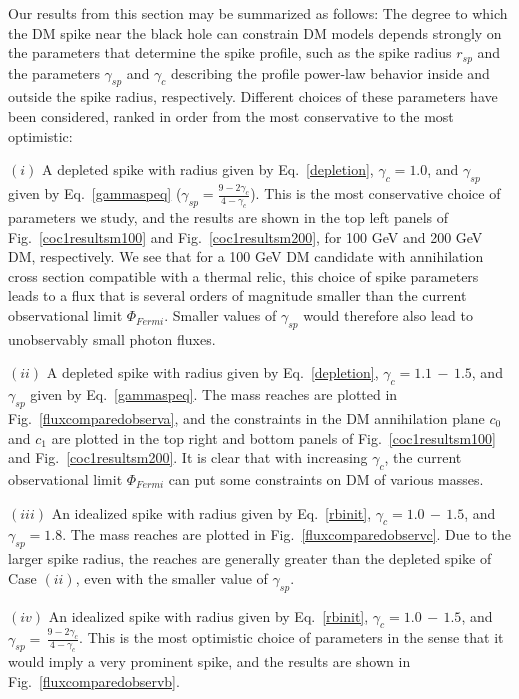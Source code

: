\documentclass[11pt]{article}
\begin{document}
Our results from this section may be summarized as follows: The degree to which the DM spike near the black hole can constrain DM models depends strongly on the parameters that determine the spike profile, such as the spike radius $r_{sp}$ and the parameters $\gamma_{sp}$ and $\gamma_c$ describing the  profile power-law behavior inside and outside the spike radius, respectively. Different choices of these parameters have been considered, ranked in order from the most conservative to the most optimistic:

$(i)$ A depleted spike with radius given by Eq.~\ref{depletion}, $\gamma_{c} = 1.0$, and $\gamma_{sp}$ given by Eq.~\ref{gammaspeq} ($\gamma_{sp}=\frac{9-2\gamma_c}{4-\gamma_c}$).  This is the most conservative choice of parameters we study, and the results are shown in the top left panels of Fig.~\ref{coc1resultsm100} and Fig.~\ref{coc1resultsm200}, for 100 GeV and 200 GeV DM, respectively. We see that for a 100 GeV DM candidate with annihilation cross section compatible with a thermal relic, this choice of spike parameters leads to a flux that is several orders of magnitude smaller than the current observational limit $\Phi_{Fermi}$.  Smaller values of $\gamma_{sp}$ would therefore also lead to unobservably small photon fluxes.

$(ii)$ A depleted spike with radius given by Eq.~\ref{depletion}, $\gamma_{c} = 1.1 \, - \,  1.5$, and $\gamma_{sp}$ given by Eq.~\ref{gammaspeq}. The mass reaches are plotted in Fig.~\ref{fluxcomparedobserva}, and the constraints in the DM annihilation plane $c_0$ and $c_1$ are plotted in the top right and bottom panels of Fig.~\ref{coc1resultsm100} and Fig.~\ref{coc1resultsm200}. It is clear that with increasing $\gamma_c$, the current observational limit $\Phi_{Fermi}$ can put some constraints on DM of various masses.

$(iii)$ An idealized spike with radius given by Eq.~\ref{rbinit}, $\gamma_{c} = 1.0 \, - \, 1.5$, and $\gamma_{sp} = 1.8$. The mass reaches are plotted in Fig.~\ref{fluxcomparedobservc}. Due to the larger spike radius, the reaches are generally greater than the depleted spike of Case $(ii)$, even with the smaller value of $\gamma_{sp}$.

$(iv)$ An idealized spike  with radius given by Eq.~\ref{rbinit}, $\gamma_{c} = 1.0 \, - \, 1.5$, and $\gamma_{sp} =  \, \frac{9-2 \gamma_c}{4 - \gamma_c}$. This is the most optimistic choice of parameters in the sense that it would imply a very prominent spike, and the results are shown in Fig.~\ref{fluxcomparedobservb}. 
\end{document}
